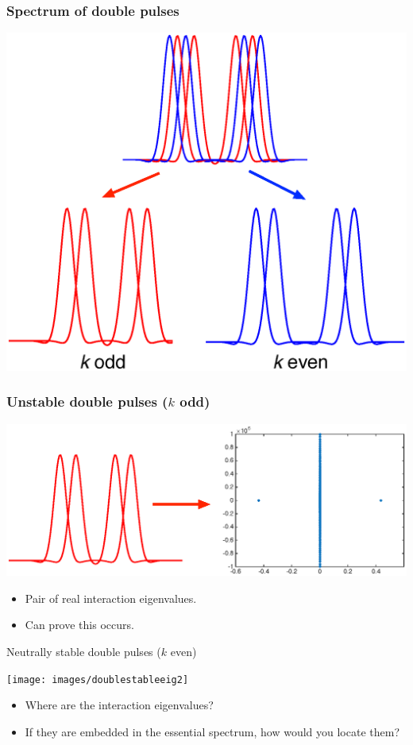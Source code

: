 \documentclass[16pt]{beamer}
\begin{document}
\begin{frame}
	\frametitle{Spectrum of double pulses}
	\begin{center}
		\includegraphics[width=0.8\linewidth]{images/dpsplit}
	\end{center}
\end{frame}

\begin{frame}
	\frametitle{Unstable double pulses ($k$ odd)}
	\fontsize{16}{7.2}\selectfont
	\begin{center}
		\includegraphics[width=1\linewidth]{images/doubleunstableeig}
	\end{center}
	\begin{itemize}
	\item Pair of real interaction eigenvalues.
	\item Can prove this occurs.
	\end{itemize}
\end{frame}

\begin{frame}{Neutrally stable double pulses ($k$ even)}
	\fontsize{16}{7.2}\selectfont
	\begin{center}
		\texttt{[image: images/doublestableeig2]}
	\end{center}
	\begin{itemize}
	\item Where are the interaction eigenvalues?
	\item If they are embedded in the essential spectrum, how would you locate them?
	\end{itemize}
\end{frame}
\end{document}
